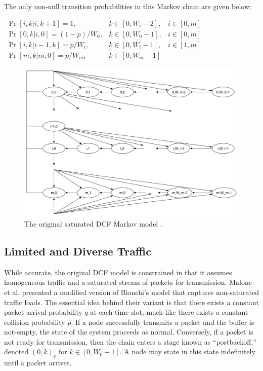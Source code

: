 \documentclass{llncs}
\begin{document}
The only non-null transition probabilities in this Markov chain are given below:

\begin{center}
\begin{math}
\begin{array}{lll}
\Pr[i,k | i, k + 1] = 1, & k \in [0, W_i - 2], & i \in [0,m] \\
\Pr[0,k | i, 0] = (1-p)/W_0, & k \in [0, W_0 - 1], & i \in [0,m] \\
\Pr[i,k | i-1, k] = p/W_i, & k \in [0, W_i - 1], & i \in [1,m] \\
\Pr[m,k | m,0] = p/W_m, & k \in [0, W_m - 1] & ~
\end{array}
\end{math}
\end{center}

\begin{figure}
\begin{center}
\includegraphics[scale=0.35]{../../sketches/dcf_model.pdf}
\caption{The original saturated DCF Markov model \cite{dcf}.}
\label{fig:dcf_model}
\end{center}
\end{figure}

\subsection{Limited and Diverse Traffic} \label{sec:nonsaturated}
While accurate, the original DCF model is constrained in that it assumes homogeneous traffic and a saturated stream of packets for transmission. Malone et al. \cite{dcf-nonsaturated} presented a modified version of Bianchi's model that captures non-saturated traffic loads. The essential idea behind their variant is that there exists a constant packet arrival probability $q$ at each time slot, much like there exists a constant collision probability $p$. If a node successfully transmits a packet and the buffer is not-empty, the state of the system proceeds as normal. Conversely, if a packet is not ready for transmission, then the chain enters a stage known as ``postbackoff,'' denoted $(0,k)_e$ for $k \in [0, W_0-1]$. A node may state in this state indefinitely until a packet arrives. 
\end{document}
